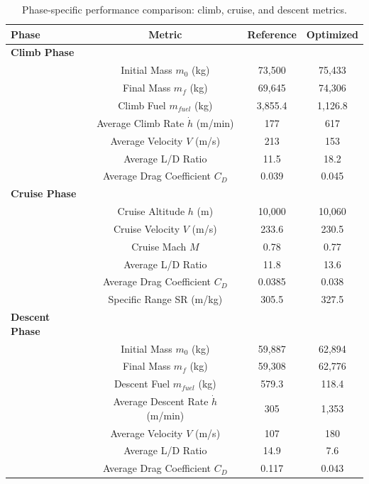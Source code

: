 
\begin{table}[h]
    \centering
    \footnotesize
    \caption{Phase-specific performance comparison: climb, cruise, and descent metrics.}
    \label{tab:phase_comparison}
    \begin{tabular}{l c c c}
        \hline
        Phase & Metric & Reference & Optimized \\
        \hline
        \textbf{Climb Phase} & & & \\
        & Initial Mass $m_0$ (kg) & 73,500 & 75,433 \\
        & Final Mass $m_f$ (kg) & 69,645 & 74,306 \\
        & Climb Fuel $m_{fuel}$ (kg) & 3,855.4 & 1,126.8 \\
        & Average Climb Rate $\dot{h}$ (m/min) & 177 & 617 \\
        & Average Velocity $V$ (m/s) & 213 & 153 \\
        & Average L/D Ratio & 11.5 & 18.2 \\
        & Average Drag Coefficient $C_D$ & 0.039 & 0.045 \\
        \hline
        \textbf{Cruise Phase} & & & \\
        & Cruise Altitude $h$ (m) & 10,000 & 10,060 \\
        & Cruise Velocity $V$ (m/s) & 233.6 & 230.5 \\
        & Cruise Mach $M$ & 0.78 & 0.77 \\
        & Average L/D Ratio & 11.8 & 13.6 \\
        & Average Drag Coefficient $C_D$ & 0.0385 & 0.038 \\
        & Specific Range SR (m/kg) & 305.5 & 327.5 \\
        \hline
        \textbf{Descent Phase} & & & \\
        & Initial Mass $m_0$ (kg) & 59,887 & 62,894 \\
        & Final Mass $m_f$ (kg) & 59,308 & 62,776 \\
        & Descent Fuel $m_{fuel}$ (kg) & 579.3 & 118.4 \\
        & Average Descent Rate $\dot{h}$ (m/min) & 305 & 1,353 \\
        & Average Velocity $V$ (m/s) & 107 & 180 \\
        & Average L/D Ratio & 14.9 & 7.6 \\
        & Average Drag Coefficient $C_D$ & 0.117 & 0.043 \\
        \hline
    \end{tabular}
\end{table}

